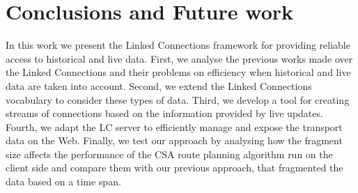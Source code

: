 \documentclass[sw]{iosart2x}
\begin{document}
	
	\section{Conclusions and Future work}
	In this work we present the Linked Connections framework for providing reliable access to historical and live data. First, we analyse the previous works made over the Linked Connections and their problems on efficiency when historical and live data are taken into account. Second, we extend the Linked Connections vocabulary to consider these types of data. Third, we develop a tool for creating streams of connections based on the information provided by live updates. Fourth, we adapt the LC server to efficiently manage and expose the transport data on the Web. Finally, we test our approach by analysing how the fragment size affects the performance of the CSA route planning algorithm run on the client side and compare them with our previous approach, that fragmented the data based on a time span.
	
\end{document}
